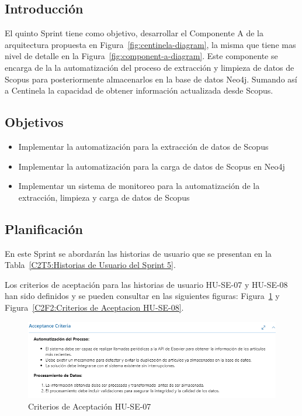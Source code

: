 \subsection{Introducción}
El quinto Sprint tiene como objetivo, desarrollar el Componente A
de la arquitectura propuesta en Figura~\ref{fig:centinela-diagram}, la misma que tiene mas nivel de
detalle en la Figura~\ref{fig:component-a-diagram}. Este componente se encarga de la
la automatización del proceso de extracción y limpieza de datos de Scopus para posteriormente almacenarlos en la base de datos Neo4j.
Sumando así a Centinela la capacidad de obtener información actualizada desde Scopus.
\subsection{Objetivos}
\begin{itemize}
    \item Implementar la automatización para la extracción de datos de Scopus
    \item Implementar la automatización para la carga de datos de Scopus en Neo4j
    \item Implementar un sistema de monitoreo para la automatización de la extracción, limpieza y carga de datos de Scopus
\end{itemize}
\subsection{Planificación}
En este Sprint se abordarán las historias de usuario que se presentan en la Tabla~\ref{C2T5:Historias de Usuario del Sprint 5}.


Los criterios de aceptación para las historias de usuario HU-SE-07 y HU-SE-08 han sido definidos y se pueden consultar en las siguientes figuras: Figura~\ref{C2F2:Criterios de Aceptacion HU-SE-07} y Figura~\ref{C2F2:Criterios de Aceptacion HU-SE-08}.

\begin{figure}[H]
    \centering
    \includegraphics[scale=0.8]{../02Figures/02Chapter/Sprints/Sprint-5/aceptance-criteria-HU-SE-07.png}
    \caption{Criterios de Aceptación HU-SE-07}\label{C2F2:Criterios de Aceptacion HU-SE-07}
\end{figure}

